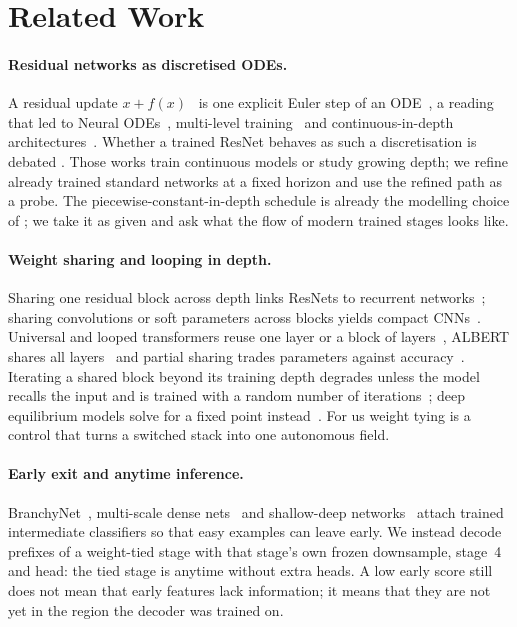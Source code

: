 \section{Related Work}
\label{sec:rel_work}

\paragraph{Residual networks as discretised ODEs.}
A residual update $x+f(x)$~\citep{he2016resnet} is one explicit Euler step of an
ODE~\citep{e2017proposal,haber2017stable,lu2018beyond}, a reading that led to
Neural ODEs~\citep{chen2019neuralordinarydifferentialequations}, multi-level
training~\citep{chang2018multilevel} and continuous-in-depth
architectures~\citep{queiruga2020continuousindepthneuralnetworks}.
Whether a trained ResNet behaves as such a discretisation is debated
\citep{queiruga2020continuousindepthneuralnetworks,sander2022residualneuralnetworksdiscretize,
cohen2021scaling,marion2024implicit}.
Those works train continuous models or study growing depth; we refine already
trained standard networks at a fixed horizon and use the refined path as a probe.
The piecewise-constant-in-depth schedule is already the modelling choice of
\citet{queiruga2020continuousindepthneuralnetworks}; we take it as given and ask what
the flow of modern trained stages looks like.

\paragraph{Weight sharing and looping in depth.}
Sharing one residual block across depth links ResNets to recurrent
networks~\citep{liao2016bridging}; sharing convolutions or soft parameters across
blocks yields compact CNNs~\citep{sharesnet,savarese2019learning}.
Universal and looped transformers reuse one layer or a block of
layers~\citep{dehghani2019universal,giannou2023looped}, ALBERT shares all
layers~\citep{lan2020albert} and partial sharing trades parameters against
accuracy~\citep{takase2021lessons,bae2024relaxed}.
Iterating a shared block beyond its training depth degrades unless the model recalls
the input and is trained with a random number of
iterations~\citep{bansal2022endtoend,geiping2025recurrent}; deep equilibrium models
solve for a fixed point instead~\citep{bai2019deep}.
For us weight tying is a control that turns a switched stack into one autonomous field.

\paragraph{Early exit and anytime inference.}
BranchyNet~\citep{teerapittayanon2016branchynet}, multi-scale dense
nets~\citep{huang2018multiscaledense} and shallow-deep
networks~\citep{kaya2019shallowdeep} attach trained intermediate classifiers so that
easy examples can leave early.
We instead decode prefixes of a weight-tied stage with that stage's own frozen
downsample, stage~4 and head: the tied stage is anytime without extra heads.
A low early score still does not mean that early features lack information; it means
that they are not yet in the region the decoder was trained on.

